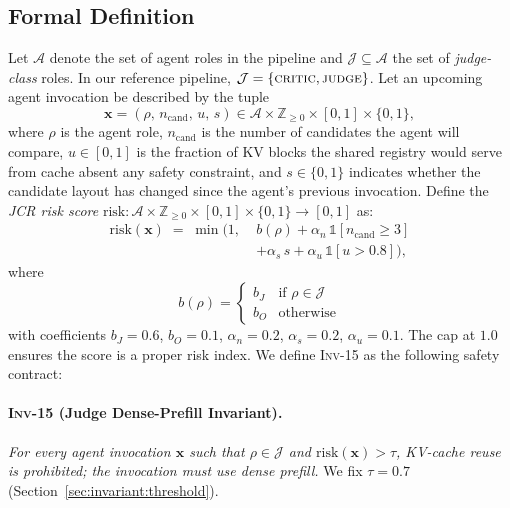 \documentclass[10pt,twocolumn]{article}
\newcommand{\INV}[1]{\textsc{Inv-#1}}
\newcommand{\Risk}{\mathrm{risk}}
\newcommand{\Judge}{\mathcal{J}}
\newcommand{\Cand}{n_{\text{cand}}}
\newcommand{\Reuse}{u}
\newcommand{\Shuf}{s}
\begin{document}
\subsection{Formal Definition}
\label{sec:invariant:def}

Let $\mathcal{A}$ denote the set of agent roles in the pipeline and
$\Judge \subseteq \mathcal{A}$ the set of \emph{judge-class} roles. In our
reference pipeline, $\Judge = \{\textsc{critic}, \textsc{judge}\}$. Let an
upcoming agent invocation be described by the tuple
\begin{equation*}
  \mathbf{x} = (\rho,\, \Cand,\, \Reuse,\, \Shuf) \in \mathcal{A}
                  \times \mathbb{Z}_{\geq 0}
                  \times [0,1] \times \{0,1\},
\end{equation*}
where $\rho$ is the agent role, $\Cand$ is the number of candidates the
agent will compare, $\Reuse \in [0,1]$ is the fraction of KV blocks the
shared registry would serve from cache absent any safety constraint, and
$\Shuf \in \{0,1\}$ indicates whether the candidate layout has changed
since the agent's previous invocation. Define the \emph{JCR risk score}
$\Risk : \mathcal{A} \times \mathbb{Z}_{\geq 0} \times [0,1] \times \{0,1\}
\rightarrow [0,1]$ as:
\begin{align}
  \Risk(\mathbf{x}) \;=\; \min\Big(1,\;
    & b(\rho)
      + \alpha_n\,\mathbb{1}[\Cand \geq 3] \nonumber \\[-2pt]
    & + \alpha_s\,\Shuf
      + \alpha_u\,\mathbb{1}[\Reuse > 0.8]
    \Big),
  \label{eq:risk}
\end{align}
where
\begin{equation}
  b(\rho) =
  \begin{cases}
    b_J & \text{if } \rho \in \Judge \\
    b_O & \text{otherwise}
  \end{cases}
  \label{eq:base}
\end{equation}
with coefficients $b_J = 0.6$, $b_O = 0.1$, $\alpha_n = 0.2$,
$\alpha_s = 0.2$, $\alpha_u = 0.1$. The cap at $1.0$ ensures the score is
a proper risk index. We define \INV{15} as the following safety
contract:

\paragraph{\INV{15} (Judge Dense-Prefill Invariant).}
\emph{For every agent invocation $\mathbf{x}$ such that
$\rho \in \Judge$ and $\Risk(\mathbf{x}) > \tau$, KV-cache reuse is
prohibited; the invocation must use dense prefill.} We fix $\tau = 0.7$
(Section~\ref{sec:invariant:threshold}).
\end{document}

